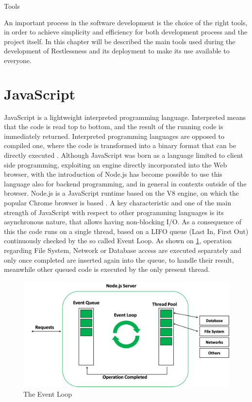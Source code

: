 \begin{chapter}{Tools}

    An important process in the software development is the choice of the right
    tools, in order to achieve simplicity and efficiency for both development
    process and the project itself.
    In this chapter will be described the main tools used during the development
    of Restlessness and its deployment to make its use available to everyone.

    \section{JavaScript}
    JavaScript is a lightweight interpreted programming language. Interpreted means
    that the code is read top to bottom, and the result of the running code is
    immediately returned. Interpreted programming languages are opposed to compiled
    one, where the code is transformed into a binary format that can be directly
    executed \cite{what_is_js}.
    Although JavaScript was born as a language limited to client side programming,
    exploiting an engine directly incorporated into the Web browser, with the
    introduction of Node.js has become possible to use this language also for backend
    programming, and in general in contexts outside of the browser.
    Node.js is a JavaScript runtime based on the V8 engine, on which the popular
    Chrome browser is based \cite{node_org}.
    A key characteristic and one of the main strength of JavaScript with respect
    to other programming languages is its asynchronous nature, that allows having
    non-blocking I/O. As a consequence of this the code runs on a single thread,
    based on a LIFO queue (Last In, First Out) continuously checked by the so called
    Event Loop.
    As shown on \ref{fig:event_loop}, operation regarding File System, Network or
    Database access are executed separately and only once completed are inserted
    again into the queue, to handle their result, meanwhile other queued code
    is executed by the only present thread.

    \begin{figure}
        \centering
        \includegraphics[width=\linewidth]{source/images/nodejs_event_loop.png}
        \caption{The Event Loop \cite{node_event_loop_2}}
        \label{fig:event_loop}
    \end{figure}


\end{chapter}
